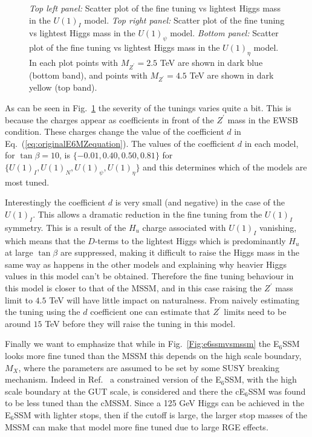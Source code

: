 \documentclass[preprint,amsmath,amssymb,aps,superscriptaddress,prd,
showpacs,floatfix,nofootinbib]{revtex4-1}
\begin{document}
\begin{figure}
\begin{center}
\caption{\textit{Top left panel:} Scatter plot of the fine tuning vs lightest
Higgs mass in the $U(1)_I$ model.  \textit{Top right panel:} Scatter plot of
the fine tuning vs lightest Higgs mass in the $U(1)_\psi$ model.
\textit{Bottom panel:} Scatter plot of the fine tuning vs lightest Higgs mass
in the $U(1)_\eta$ model.  In each plot points with $M_{Z^\prime} = 2.5$ TeV
are shown in dark blue (bottom band), and points with $M_{Z^\prime} = 4.5$
TeV are shown in dark yellow (top band).}
\label{Fig:othere6modelsvsmssm}
\end{center}
\end{figure}

As can be seen in Fig.~\ref{Fig:othere6modelsvsmssm} the severity of the
tunings varies quite a bit.  This is because the charges appear as
coefficients in front of the $Z^\prime$ mass in the EWSB condition.  These
charges change the value of the coefficient $d$ in
Eq.~(\ref{eq:originalE6MZequation}).  The values of the coefficient $d$ in
each model, for $\tan\beta = 10$, is $\{-0.01 , 0.40 , 0.50 , 0.81 \}$ for
$\{U(1)_I , U(1)_N , U(1)_\psi , U(1)_\eta \}$ and this determines which of
the models are most tuned.

Interestingly the coefficient $d$ is very small (and negative) in the
case of the $U(1)_I$.  This allows a dramatic reduction in the fine
tuning from the $U(1)_I$ symmetry.  This is a result of the $H_u$
charge associated with $U(1)_I$ vanishing, which means that the
$D$-terms to the lightest Higgs which is predominantly $H_u$ at large
$\tan\beta$ are suppressed, making it difficult to raise the Higgs
mass in the same way as happens in the other models and explaining why
heavier Higgs values in this model can't be obtained.  Therefore the
fine tuning behaviour in this model is closer to that of the MSSM, and
in this case raising the $Z^\prime$ mass limit to $4.5$ TeV will have
little impact on naturalness.  From naively estimating the tuning
using the $d$ coefficient one can estimate that $Z^\prime$ limits
need to be around $15$ TeV before they will raise the tuning in this
model.

Finally we want to emphasize that while in Fig.~\ref{Fig:e6ssmvsmssm}
the E$_6$SSM looks more fine tuned than the MSSM this depends on the
high scale boundary, $M_X$, where the parameters are assumed to be set
by some SUSY breaking mechanism.  Indeed in Ref.~\cite{Athron:2013ipa} a
constrained version of the E$_6$SSM, with the high scale boundary at
the GUT scale, is considered and there the cE$_6$SSM was found to be
less tuned than the cMSSM.  Since a 125 GeV Higgs can be achieved in
the E$_6$SSM with lighter stops, then if the cutoff is large, the
larger stop masses of the MSSM can make that model more fine tuned due
to large RGE effects.
\end{document}
